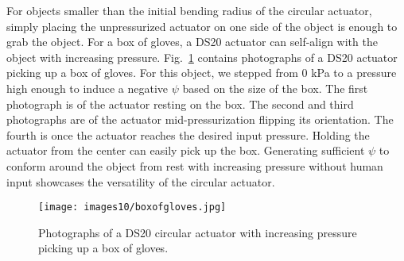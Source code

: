 \clearpage
For objects smaller than the initial bending radius of the circular actuator, simply placing the unpressurized actuator on one side of the object is enough to grab the object. For a box of gloves, a DS20 actuator can self-align with the object with increasing pressure. Fig.~\ref{fig:boxofgloves} contains photographs of a DS20 actuator picking up a box of gloves. For this object, we stepped from 0 kPa to a pressure high enough to induce a negative $\psi$ based on the size of the box. The first photograph is of the actuator resting on the box. The second and third photographs are of the actuator mid-pressurization flipping its orientation. The fourth is once the actuator reaches the desired input pressure. Holding the actuator from the center can easily pick up the box. Generating sufficient $\psi$ to conform around the object from rest with increasing pressure without human input showcases the versatility of the circular actuator. \\

\begin{figure}[!ht]
    \centering
     \texttt{[image: images10/boxofgloves.jpg]}
    \caption{Photographs of a DS20 circular actuator with increasing pressure picking up a box of gloves.}
    \label{fig:boxofgloves}
\end{figure}

